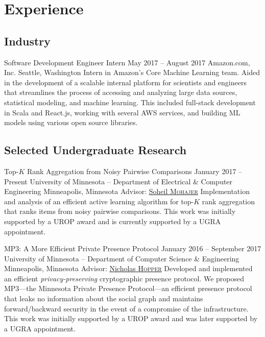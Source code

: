 \section{Experience}
\subsection{Industry}
\block
  {Software Development Engineer Intern}
  {May 2017 -- August 2017}
  {Amazon.com, Inc.}
  {Seattle, Washington}
  {}
  {
    Intern in Amazon's Core Machine Learning team. Aided in the development
    of a scalable internal platform for scientists and engineers that
    streamlines the process of accessing and analyzing large data sources,
    statistical modeling, and machine learning. This included full-stack
    development in Scala and React.js, working with several AWS services, and
    building ML models using various open source libraries.
  }

\subsection{Selected Undergraduate Research}
\block
  {Top-\boldmath$K$ Rank Aggregation from Noisy Pairwise Comparisons}
  {January 2017 -- Present}
  {University of Minnesota -- Department of Electrical \& Computer Engineering}
  {Minneapolis, Minnesota}
  {Advisor: \href{\soheil}{Soheil \textsc{Mohajer}}}
  {
    Implementation and analysis of an efficient active learning algorithm for
    top-$K$ rank aggregation that ranks items from noisy pairwise comparisons.
    This work was initially supported by a UROP award and is currently supported
    by a UGRA appointment.
  }

\block
  {MP3: A More Efficient Private Presence Protocol}
  {January 2016 -- September 2017}
  {University of Minnesota -- Department of Computer Science \& Engineering}
  {Minneapolis, Minnesota}
  {Advisor: \href{\hoppernj}{Nicholas \textsc{Hopper}}}
  {
    Developed and implemented an efficient \emph{privacy-preserving}
    cryptographic presence protocol. We proposed MP3---the Minnesota Private
    Presence Protocol---an efficient presence protocol that leaks no information
    about the social graph and maintains forward/backward security in the event
    of a compromise of the infrastructure.  This work was initially supported by
    a UROP award and was later supported by a UGRA appointment. %
  }

